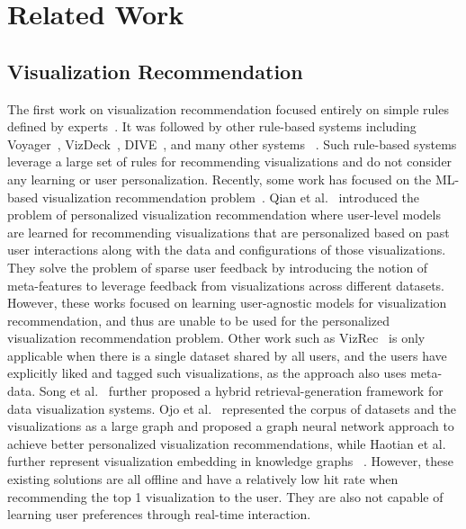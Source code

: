 \section{Related Work}
\subsection{Visualization Recommendation}
The first work on visualization recommendation focused entirely on simple rules defined by experts~\cite{mackinlay1986automating,feiner1985apex}.
It was followed by other rule-based systems including Voyager~\cite{vartak2017towards, wongsuphasawat2016voyager, wongsuphasawat2017voyager}, VizDeck~\cite{perry2013vizdeck}, DIVE~\cite{hu2018dive}, and many other systems ~\cite{choo2014visirr,gotz2009behavior}.
Such rule-based systems leverage a large set of rules for recommending visualizations and do not consider any learning or user personalization.
Recently, some work has focused on the ML-based visualization recommendation problem~\cite{ML-based-Vis-Rec,data2vis,demiralp2017foresight-vldb,kaur2015towards}. Qian et al.~\cite{qian_personalized_2021} introduced the problem of personalized visualization recommendation where user-level models are learned for recommending visualizations that are personalized based on past user interactions along with the data and configurations of those visualizations. They solve the problem of sparse user feedback by introducing the notion of meta-features to leverage feedback from visualizations across different datasets. However, these works focused on learning user-agnostic models for visualization recommendation, and thus are unable to be used for the personalized visualization recommendation problem. Other work such as VizRec~\cite{mutlu_vizrec_2016} is only applicable when there is a single dataset shared by all users, and the users have explicitly liked and tagged such visualizations, as the approach also uses meta-data.
Song et al.~\cite{song2022rgvisnet} further proposed a hybrid retrieval-generation framework for data visualization systems. 
Ojo et al.~\cite{ojo_visgnn_2022} represented the corpus of datasets and the visualizations as a large graph and proposed a graph neural network approach to achieve better personalized visualization recommendations, while Haotian et al. further represent visualization embedding in knowledge graphs ~\cite{li2021kg4vis}. However, these existing solutions are all offline and have a relatively low hit rate when recommending the top 1 visualization to the user. 
They are also not capable of learning user preferences through real-time interaction.


